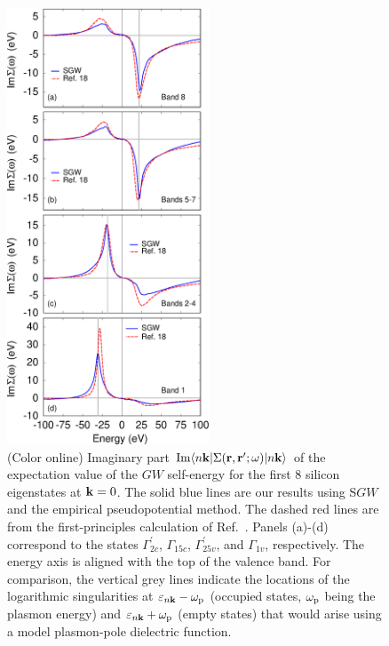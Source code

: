 \documentclass[twocolumn,prb,showpacs,superscriptaddress]{revtex4}
\def\w{\omega}
\def\E{\varepsilon}
\def\k{{\bf k}}
\def\r{{\bf r}}
\def\rp{{\bf r^\prime}}
\begin{document}
\begin  {figure}
\begin  {center}
\includegraphics[width=6cm]{fig5.eps}
\end    {center}
\caption{\label{fig5}
        (Color online)
        Imaginary part ${\rm Im} \langle n\k| \Sigma(\r,\rp;\w)|n\k\rangle$ of the expectation value of the $GW$ self-energy for the first
        8 silicon eigenstates at $\k=0$. The solid blue lines are our results using S$GW$ and the empirical
        pseudopotential method. The dashed red lines are from the first-principles calculation of Ref.\ .
        Panels (a)-(d) correspond to the states $\Gamma^\prime_{2c}$, $\Gamma_{15c}$, $\Gamma^\prime_{25v}$, and $\Gamma_{1v}$, respectively.
        The energy axis is aligned with the top of the valence band.
        For comparison, the vertical grey lines indicate the locations of the logarithmic singularities at $\E_{n\k}-\w_{\rm p}$ (occupied states,
        $\w_{\rm p}$ being the plasmon energy) and $\E_{n\k}+\w_{\rm p}$ (empty states) that would arise using a model
        plasmon-pole dielectric function.\cite{hl}
        }
\end    {figure}
\end{document}
